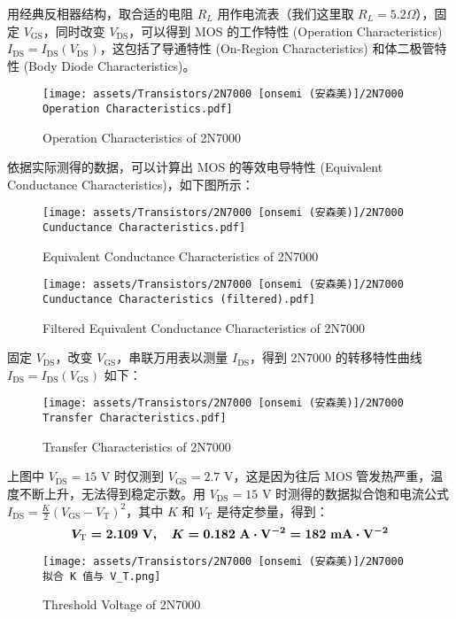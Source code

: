 \documentclass[UTF8]{report}
\begin{document}
用经典反相器结构，取合适的电阻 $R_L$ 用作电流表（我们这里取 $R_L = 5.2 \Omega$），固定 $V_\text{GS}$，同时改变 $V_\text{DS}$，可以得到 MOS 的工作特性 (Operation Characteristics) $I_\text{DS} = I_\text{DS}(V_\text{DS})$，这包括了导通特性 (On-Region Characteristics) 和体二极管特性 (Body Diode Characteristics)。
\begin{figure}[H]\centering
    \texttt{[image: assets/Transistors/2N7000 [onsemi (安森美)]/2N7000 Operation Characteristics.pdf]}
    \caption{Operation Characteristics of 2N7000}
\end{figure}
依据实际测得的数据，可以计算出 MOS 的等效电导特性 (Equivalent Conductance Characteristics)，如下图所示：
\begin{figure}[H]\centering
    \texttt{[image: assets/Transistors/2N7000 [onsemi (安森美)]/2N7000 Cunductance Characteristics.pdf]}
    \caption{Equivalent Conductance Characteristics of 2N7000}
\end{figure}
\begin{figure}[H]\centering
    \texttt{[image: assets/Transistors/2N7000 [onsemi (安森美)]/2N7000 Cunductance Characteristics (filtered).pdf]}
    \caption{Filtered Equivalent Conductance Characteristics of 2N7000}
\end{figure}

固定 $V_{\text{DS}}$，改变 $V_\text{GS}$，串联万用表以测量 $I_\text{DS}$，得到 2N7000 的转移特性曲线 $I_\text{DS} = I_\text{DS}(V_\text{GS})$ 如下：
\begin{figure}[H]\centering
    \texttt{[image: assets/Transistors/2N7000 [onsemi (安森美)]/2N7000 Transfer Characteristics.pdf]}
    \caption{Transfer Characteristics of 2N7000}
\end{figure}
上图中 $V_\text{DS} = 15$ V 时仅测到 $V_\text{GS} = 2.7$ V，这是因为往后 MOS 管发热严重，温度不断上升，无法得到稳定示数。用 $V_\text{DS} = 15$ V 时测得的数据拟合饱和电流公式 $I_\text{DS} = \frac{K}{2} \left( V_\text{GS} - V_\text{T} \right)^2$，其中 $K$ 和 $V_\text{T}$ 是待定参量，得到：
\begin{equation}
\boldmath V_\text{T} = 2.109 \ \mathrm{V},\quad K = 0.182 \ \mathrm{A\cdot V^{-2}} = 182 \ \mathrm{mA\cdot V^{-2}}
\end{equation}


\begin{figure}[H]\centering
    \texttt{[image: assets/Transistors/2N7000 [onsemi (安森美)]/2N7000 拟合 K 值与 V\_T.png]}
    \caption{Threshold Voltage of 2N7000}
\end{figure}
\end{document}
